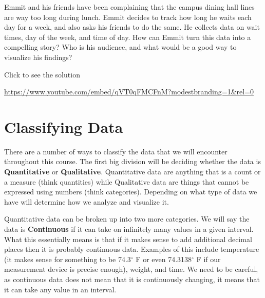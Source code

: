 \documentclass[
  letterpaper,
  DIV=11,
  numbers=noendperiod]{scrreprt}
\begin{document}
\begin{tcolorbox}[enhanced jigsaw, colbacktitle=quarto-callout-tip-color!10!white, breakable, bottomrule=.15mm, colframe=quarto-callout-tip-color-frame, left=2mm, opacitybacktitle=0.6, title=\textcolor{quarto-callout-tip-color}{\faLightbulb}\hspace{0.5em}{Try it Out}, leftrule=.75mm, opacityback=0, rightrule=.15mm, titlerule=0mm, bottomtitle=1mm, colback=white, toprule=.15mm, arc=.35mm, toptitle=1mm, coltitle=black]

Emmit and his friends have been complaining that the campus dining hall
lines are way too long during lunch. Emmit decides to track how long he
waits each day for a week, and also asks his friends to do the same. He
collects data on wait times, day of the week, and time of day. How can
Emmit turn this data into a compelling story? Who is his audience, and
what would be a good way to visualize his findings?

Click to see the solution

\url{https://www.youtube.com/embed/qVT0qFMCFnM?modestbranding=1&rel=0}

\end{tcolorbox}

\section{Classifying Data}\label{classifying-data}

There are a number of ways to classify the data that we will encounter
throughout this course. The first big division will be deciding whether
the data is \textbf{Quantitative} or \textbf{Qualitative}. Quantitative
data are anything that is a count or a measure (think quantities) while
Qualitative data are things that cannot be expressed using numbers
(think categories). Depending on what type of data we have will
determine how we analyze and visualize it.

Quantitative data can be broken up into two more categories. We will say
the data is \textbf{Continuous} if it can take on infinitely many values
in a given interval. What this essentially means is that if it makes
sense to add additional decimal places then it is probably continuous
data. Examples of this include temperature (it makes sense for something
to be 74.3\(^\circ\) F or even 74.3138\(^\circ\) F if our measurement
device is precise enough), weight, and time. We need to be careful, as
continuous data does not mean that it is continuously changing, it means
that it can take any value in an interval.
\end{document}
